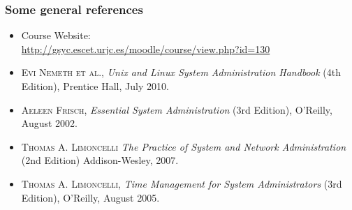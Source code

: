 \documentclass{beamer}
\begin{document}
\begin{frame}
\frametitle{Some general references}

\begin{itemize}
\item Course Website: \\
  {\footnotesize \url{http://gsyc.escet.urjc.es/moodle/course/view.php?id=130}}
\item \textsc{Evi Nemeth et al.}, \textit{Unix and Linux System Administration Handbook} (4th Edition), Prentice Hall, July 2010.
\item \textsc{Aeleen Frisch}, \textit{Essential System Administration} (3rd Edition), O'Reilly, August 2002.
\item \textsc{Thomas A. Limoncelli} \textit{The Practice of System and Network Administration} (2nd Edition) Addison-Wesley, 2007. 
\item \textsc{Thomas A. Limoncelli}, \textit{Time Management for System Administrators} (3rd Edition), O'Reilly, August 2005.

\end{itemize}

\end{frame}

\end{document}
